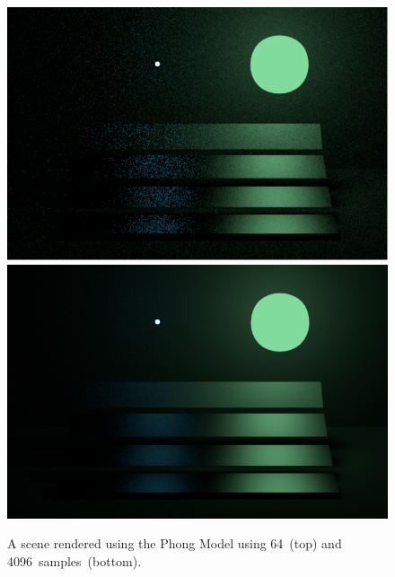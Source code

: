 \documentclass{article}
\begin{document}
\begin{figure}[p]
\centering
\includegraphics[width=\textwidth]{assets/phong64}\\
\includegraphics[width=\textwidth]{assets/phong4096}
\caption{A scene rendered using the Phong Model using 64~(top) and 4096~samples~(bottom).}
\end{figure}
\end{document}
